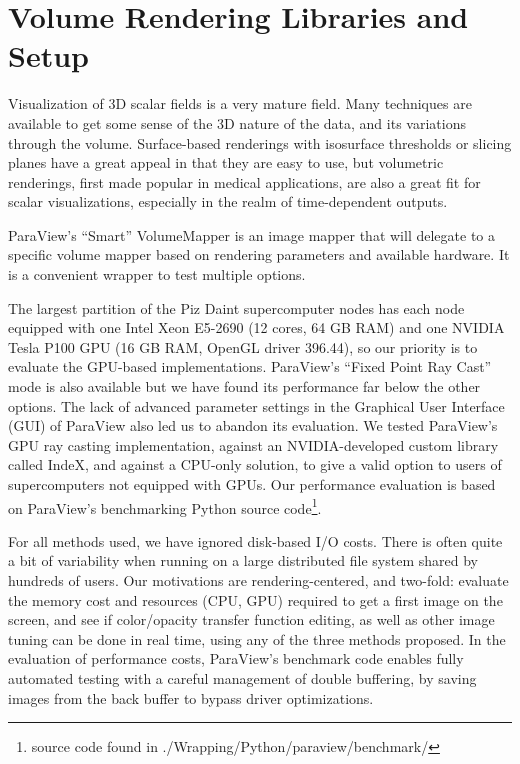 \documentclass[5p,times]{elsarticle}
\begin{document}
\section{Volume Rendering Libraries and Setup}

Visualization of 3D scalar fields is a very mature field. Many techniques are
available to get some sense of the 3D nature of the data, and its variations
through the volume. Surface-based renderings with isosurface thresholds or
slicing planes have a great appeal in that they are easy to use, but volumetric
renderings, first made popular in medical applications, are also a great fit for
scalar visualizations, especially in the realm of time-dependent outputs.

ParaView's ``Smart'' VolumeMapper is an image mapper
that will delegate to a specific volume mapper based on rendering parameters and
available hardware. It is a convenient wrapper to test multiple options.

The largest partition of the Piz Daint supercomputer nodes has each node equipped
with one Intel Xeon E5-2690 (12 cores, 64 GB RAM) and one NVIDIA
Tesla P100 GPU (16 GB RAM, OpenGL driver 396.44), so our priority is to evaluate
the GPU-based implementations.
ParaView's ``Fixed Point Ray Cast'' mode is also available but we have found its performance far
below the other options. The lack of advanced parameter settings in the Graphical
User Interface (GUI) of ParaView also led us to abandon its evaluation. We tested ParaView's GPU
ray casting implementation, against an NVIDIA-developed custom library called
IndeX, and against a CPU-only solution, to give a valid option to users of
supercomputers not equipped with GPUs.
Our performance evaluation is based on ParaView's benchmarking Python source
code\footnote{source code found in ./Wrapping/Python/paraview/benchmark/}.

For all methods used, we have ignored disk-based I/O costs. There is often quite
a bit of variability when running on a large distributed file system shared by
hundreds of users. Our motivations are rendering-centered, and two-fold:
evaluate the memory cost and resources (CPU, GPU) required to get a first image
on the screen, and see if color/opacity transfer
function editing, as well as other image tuning can be done in real time, using
any of the three methods proposed. In the evaluation of performance costs, ParaView's
benchmark code enables fully automated testing with a careful management of
double buffering, by saving images from the back buffer to bypass driver optimizations.
\end{document}
